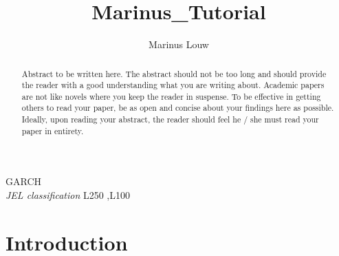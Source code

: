 \documentclass[11pt,preprint, authoryear]{elsarticle}
\numberwithin{equation}{section}
\numberwithin{figure}{section}
\numberwithin{table}{section}
\begin{document}
\begin{frontmatter}  %

\title{Marinus\_Tutorial}





\author[Add1]{Marinus Louw}





\address[Add1]{Financial Economtrics Course, Stellenbosch University, South Africa}


\begin{abstract}
\small{
Abstract to be written here. The abstract should not be too long and
should provide the reader with a good understanding what you are writing
about. Academic papers are not like novels where you keep the reader in
suspense. To be effective in getting others to read your paper, be as
open and concise about your findings here as possible. Ideally, upon
reading your abstract, the reader should feel he / she must read your
paper in entirety.
}
\end{abstract}

\vspace{1cm}

\begin{keyword}
\footnotesize{
GARCH \\ \vspace{0.3cm}
\textit{JEL classification} L250 \sep L100
}
\end{keyword}
\vspace{0.5cm}
\end{frontmatter}



\pagestyle{fancy}
\chead{}
\rhead{}
\lfoot{}
\lhead{}
\cfoot{}


\headsep 35pt %




\section{\texorpdfstring{Introduction
\label{Introduction}}{Introduction }}\label{introduction}
\end{document}
